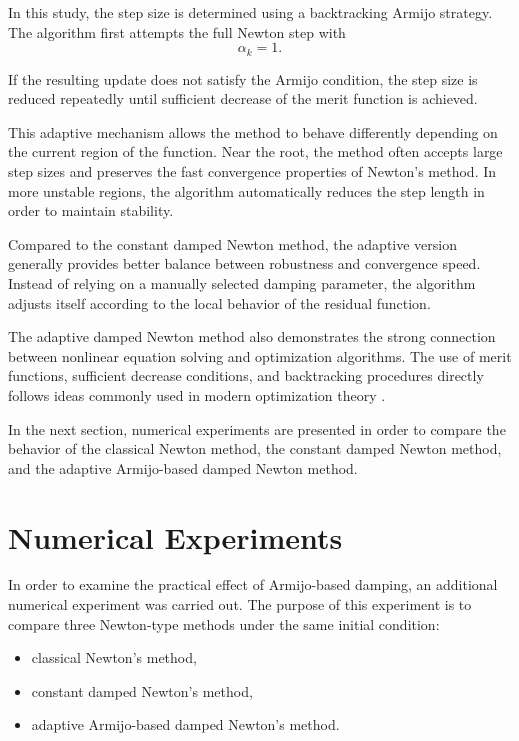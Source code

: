 In this study, the step size is determined using a backtracking Armijo strategy. The algorithm first attempts the full Newton step with
\[
\alpha_k=1.
\]

If the resulting update does not satisfy the Armijo condition, the step size is reduced repeatedly until sufficient decrease of the merit function is achieved.

This adaptive mechanism allows the method to behave differently depending on the current region of the function. Near the root, the method often accepts large step sizes and preserves the fast convergence properties of Newton's method. In more unstable regions, the algorithm automatically reduces the step length in order to maintain stability.

Compared to the constant damped Newton method, the adaptive version generally provides better balance between robustness and convergence speed. Instead of relying on a manually selected damping parameter, the algorithm adjusts itself according to the local behavior of the residual function.

The adaptive damped Newton method also demonstrates the strong connection between nonlinear equation solving and optimization algorithms. The use of merit functions, sufficient decrease conditions, and backtracking procedures directly follows ideas commonly used in modern optimization theory \cite{nocedal}.

In the next section, numerical experiments are presented in order to compare the behavior of the classical Newton method, the constant damped Newton method, and the adaptive Armijo-based damped Newton method.

\section{Numerical Experiments}

In order to examine the practical effect of Armijo-based damping, an additional numerical experiment was carried out. The purpose of this experiment is to compare three Newton-type methods under the same initial condition:

\begin{itemize}
    \item classical Newton's method,
    \item constant damped Newton's method,
    \item adaptive Armijo-based damped Newton's method.
\end{itemize}

